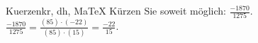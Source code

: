 \begin{MAufgabe}{Kuerzen}{kr, dh, MaTeX}
K\"urzen Sie soweit m\"oglich: $\frac{-1870}{1275}$.\\ 
\ifLsg\MLoesung
\quad $\frac{-1870}{1275}=\frac{(85)\cdot(-22)}{(85)\cdot(15)}=\frac{-22}{15}$.\else\relax\fi
 \end{MAufgabe}